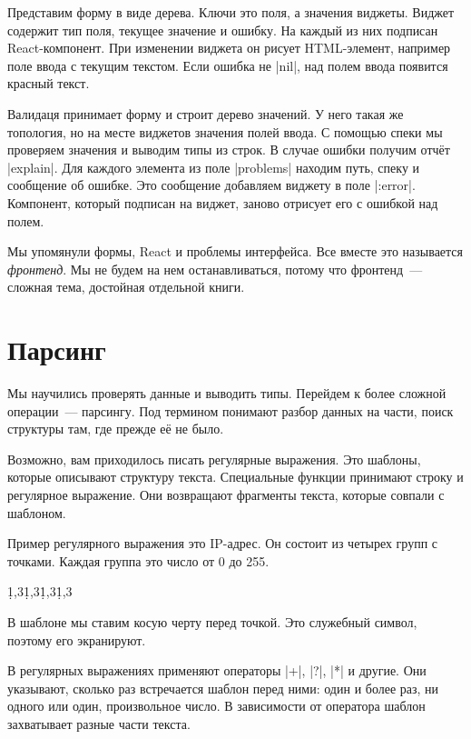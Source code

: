 Представим форму в виде дерева. Ключи это поля, а значения виджеты. Виджет
содержит тип поля, текущее значение и ошибку. На каждый из них подписан
React-компонент. При изменении виджета он рисует HTML-элемент, например поле
ввода с текущим текстом. Если ошибка не \spverb|nil|, над полем ввода появится
красный текст.

Валидаця принимает форму и строит дерево значений. У него такая же топология, но
на месте виджетов значения полей ввода. С помощью спеки мы проверяем значения и
выводим типы из строк. В случае ошибки получим отч\"{е}т \spverb|explain|. Для
каждого элемента из поле \spverb|problems| находим путь, спеку и сообщение об
ошибке. Это сообщение добавляем виджету в поле \spverb|:error|. Компонент,
который подписан на виджет, заново отрисует его с ошибкой над полем.


Мы упомянули формы, React и проблемы интерфейса. Все вместе это называется
\emph{фронтенд}. Мы не будем на нем останавливаться, потому что фронтенд~---
сложная тема, достойная отдельной книги.

\section{Парсинг}

Мы научились проверять данные и выводить типы. Перейдем к более сложной
операции~--- парсингу. Под термином понимают разбор данных на части, поиск
структуры там, где прежде е\"{е} не было.

Возможно, вам приходилось писать регулярные выражения. Это шаблоны, которые
описывают структуру текста. Специальные функции принимают строку и регулярное
выражение. Они возвращают фрагменты текста, которые совпали с шаблоном.

Пример регулярного выражения это IP-адрес. Он состоит из четырех групп с
точками. Каждая группа это число от 0 до 255.


\begin{english}
  \begin{text}
\d{1,3}\.\d{1,3}\.\d{1,3}\.\d{1,3}
  \end{text}
\end{english}

В шаблоне мы ставим косую черту перед точкой. Это служебный символ, поэтому его
экранируют.

В регулярных выражениях применяют операторы \spverb|+|, \spverb|?|, \spverb|*| и
другие. Они указывают, сколько раз встречается шаблон перед ними: один и более
раз, ни одного или один, произвольное число. В зависимости от оператора шаблон
захватывает разные части текста.

